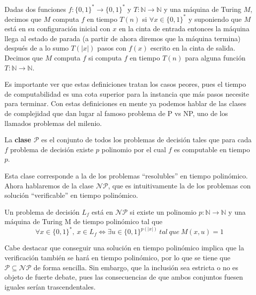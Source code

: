 \begin{definicion}
Dadas dos funciones $f: \{0,1\}^* \rightarrow \{0,1\}^*$ y $T: \mathbb{N} \rightarrow \mathbb{N}$ y una máquina de Turing $M$, decimos que $M$ computa $f$ en tiempo $T(n)$ si $\forall x \in \{0,1\}^*$ y suponiendo que $M$ está en su configuración inicial con $x$ en la cinta de entrada entonces la máquina llega al estado de parada (a partir de ahora diremos que la máquina termina) después de a lo sumo $T(|x|)$ pasos con $f(x)$ escrito en la cinta de salida. \\
Decimos que $M$ computa $f$ si computa $f$ en tiempo $T(n)$ para alguna función $T: \mathbb{N} \rightarrow \mathbb{N}$.
\end{definicion}

Es importante ver que estas definiciones tratan los casos peores, pues el tiempo de computabilidad es una cota superior para la instancia que más pasos necesite para terminar. Con estas definiciones en mente ya podemos hablar de las clases de complejidad que dan lugar al famoso problema de P vs NP, uno de los llamados problemas del milenio.

\begin{definicion}
La \textbf{clase $\mathcal{P}$} es el conjunto de todos los problemas de decisión tales que para cada $f$ problema de decisión existe $p$ polinomio por el cual $f$ es computable en tiempo $p$.
\end{definicion}

Esta clase corresponde a la de los problemas ``resolubles'' en tiempo polinómico. Ahora hablaremos de la clase $\mathcal{NP}$, que es intuitivamente la de los problemas con solución ``verificable'' en tiempo polinómico. 
\begin{definicion}
Un problema de decisión $L_f$ está en $\mathcal{NP}$ si existe un polinomio $p: \mathbb{N} \rightarrow \mathbb{N}$ y una máquina de Turing M de tiempo polinómico tal que
$$\forall x \in \{0,1\}^{*}, \ x \in L_f \Leftrightarrow \exists u \in \{0,1\}^{p(|x|)} \ tal \ que \ M(x, u) = 1$$
\end{definicion}

Cabe destacar que conseguir una solución en tiempo polinómico implica que la verificación también se hará en tiempo polinómico, por lo que se tiene que $\mathcal{P} \subseteq \mathcal{NP}$ de forma sencilla. Sin embargo, que la inclusión sea estricta o no es objeto de fuerte debate, pues las consecuencias de que ambos conjuntos fuesen iguales serían trascendentales.

